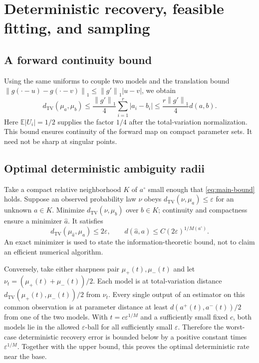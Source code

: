 \documentclass[11pt,a4paper]{article}
\numberwithin{equation}{section}
\theoremstyle{definition}
\theoremstyle{remark}
\newcommand{\E}{\mathbb E}
\newcommand{\TV}{d_{\mathrm{TV}}}
\newcommand{\norm}[1]{\left\lVert#1\right\rVert}
\newcommand{\base}{a^{\circ}}
\begin{document}
\section{Deterministic recovery, feasible fitting, and sampling}
\label{sec:recovery}

\subsection{A forward continuity bound}
Using the same uniforms to couple two models and the translation bound
$\norm{g(\cdot-u)-g(\cdot-v)}_1\le\norm{g'}_1|u-v|$, we obtain
\begin{equation}
 \TV(\mu_a,\mu_b)
 \le\frac{\norm{g'}_1}{4}\sum_{i=1}^r|a_i-b_i|
 \le\frac{r\norm{g'}_1}{4}d(a,b).
 \label{eq:forward}
\end{equation}
Here $\E|U_i|=1/2$ supplies the factor $1/4$ after the total-variation
normalization.  This bound ensures continuity of the forward map on compact
parameter sets.  It need not be sharp at singular points.

\subsection{Optimal deterministic ambiguity radii}
Take a compact relative neighborhood $K$ of $\base$ small enough that
\eqref{eq:main-bound} holds.  Suppose an observed probability law $\nu$ obeys
$\TV(\nu,\mu_a)\le\varepsilon$ for an unknown $a\in K$.  Minimize
$\TV(\nu,\mu_b)$ over $b\in K$; continuity and compactness ensure a minimizer
$\widehat a$.  It satisfies
\[
 \TV(\mu_{\widehat a},\mu_a)\le2\varepsilon,
 \qquad d(\widehat a,a)\le C(2\varepsilon)^{1/M(\base)}.
\]
An exact minimizer is used to state the information-theoretic bound, not to
claim an efficient numerical algorithm.

Conversely, take either sharpness pair $\mu_+(t),\mu_-(t)$ and let
$\nu_t=(\mu_+(t)+\mu_-(t))/2$.  Each model is at total-variation distance
$\TV(\mu_+(t),\mu_-(t))/2$ from $\nu_t$.  Every single output of an estimator
on this common observation is at parameter distance at least
$d(a^+(t),a^-(t))/2$ from one of the two models.  With
$t=c\varepsilon^{1/M}$ and a sufficiently small fixed $c$, both models lie
in the allowed $\varepsilon$-ball for all sufficiently small $\varepsilon$.
Therefore the worst-case deterministic recovery error is bounded below by a
positive constant times $\varepsilon^{1/M}$.  Together with the upper bound,
this proves the optimal deterministic rate near the base.
\end{document}
